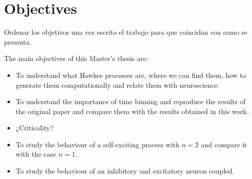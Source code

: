 \chapter{Objectives} \label{ch:objectives}
Ordenar los objetivos una vez escrito el trabajo para que coincidan con como se presenta. 

The main objectives of this Master's thesis are:

\begin{itemize}
    \item To understand what Hawkes processes are, where we can find them, how to generate them computationally and relate them with neuroscience.
    \item To understand the importance of time binning and reproduce the results of the original paper 
    \cite{notarmuzi2021percolation} and compare them with the results obtained in this work.
    \item ¿Criticality?
    \item To study the behaviour of a self-exciting process with $n=2$ and compare it with the case $n=1$. 
    \item To study the behaviour of an inhibitory and excitatory neuron coupled.
\end{itemize}